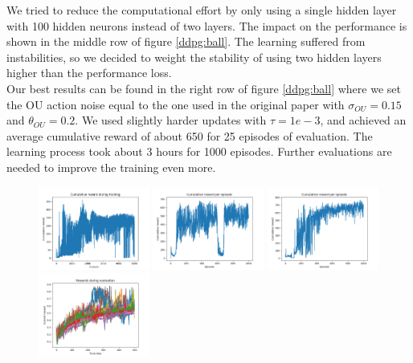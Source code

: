 We tried to reduce the computational effort by only using a single hidden layer with 100 hidden neurons instead of two layers. The impact on the performance is shown in the middle row of figure \ref{ddpg:ball}. The learning suffered from instabilities, so we decided to weight the stability of using two hidden layers higher than the performance loss.\\
Our best results can be found in the right row of figure \ref{ddpg:ball} where we set the OU action noise equal to the one used in the original paper with $\sigma_{OU}=0.15$ and $\theta_{OU}=0.2$. We used slightly harder updates with $\tau=1e-3$, and achieved an average cumulative reward of about 650 for 25 episodes of evaluation. The learning process took about 3 hours for 1000 episodes. Further evaluations are needed to improve the training even more.
\begin{figure}
	\includegraphics[width=0.325\textwidth]{plots/ddpg_ball_first_train.png}
	\includegraphics[width=0.325\textwidth]{plots/ddpg_ball_1layer_train.png}
	\includegraphics[width=0.325\textwidth]{plots/ddpg_ball_best_train.png}
	\includegraphics[width=0.325\textwidth]{plots/ddpg_ball_first_eval.png}

\end{figure}
